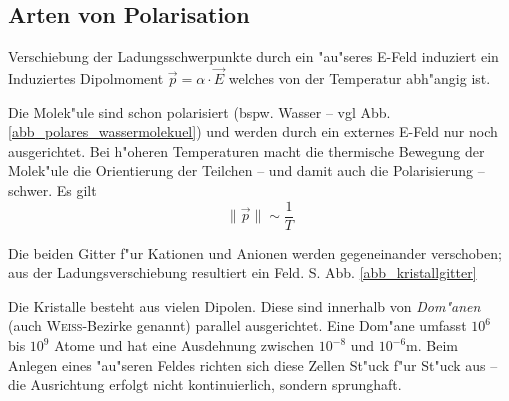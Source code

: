 \subsection{Arten von Polarisation}
\label{kap_arten-von-polarisation}

\begin{description}[\setlabelstyle{\bfseries\slshape}]
\item[\index{Verschiebungspolarisation}Verschiebungspolarisation] Verschiebung der Ladungsschwerpunkte
   durch ein "au"seres E-Feld induziert ein Induziertes Dipolmoment
   $\vec p = \alpha \cdot \vec E$ welches von der Temperatur abh"angig ist.
\item[\index{Orientierungspolarisation}Orientierungspolarisation] Die Molek"ule sind schon
   polarisiert (bspw. Wasser -- vgl Abb. \ref{abb_polares_wassermolekuel}) und werden
   durch ein externes E-Feld nur noch ausgerichtet. Bei h"oheren
   Temperaturen macht die thermische Bewegung der Molek"ule die
   Orientierung der Teilchen -- und damit auch die Polarisierung --
   schwer. Es gilt $$\|\vec p\| \sim \frac{1}{T}$$
\item[\index{Ionenpolarisation}Ionenpolarisation] Die beiden Gitter f"ur Kationen und Anionen
   werden gegeneinander verschoben; aus der Ladungsverschiebung
   resultiert ein Feld. S. Abb. \ref{abb_kristallgitter}
\item[\index{Ferroelektrika}Ferroelektrika] Die Kristalle besteht aus
   vielen Dipolen. Diese sind innerhalb von \emph{Dom"anen} (auch
   \textsc{Weiss}-Bezirke genannt) parallel
   ausgerichtet. Eine Dom"ane umfasst $10^6$ bis $10^9$ Atome und hat
   eine Ausdehnung zwischen $10^{-8}$ und $10^{-6}$m. Beim Anlegen
   eines "au"seren Feldes richten sich diese Zellen St"uck f"ur St"uck aus
   -- die Ausrichtung erfolgt nicht kontinuierlich, sondern
   sprunghaft.
\end{description}

